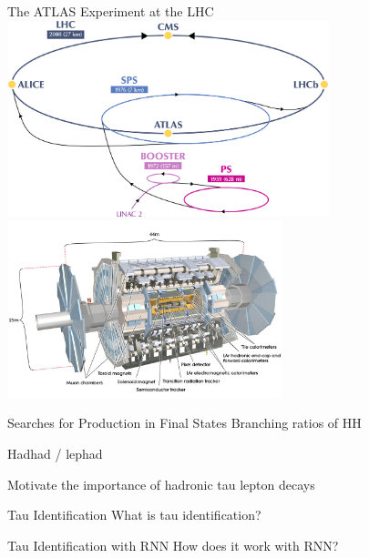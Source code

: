 \documentclass[11pt, xcolor={dvipsnames}, aspectratio=169]{beamer}
\begin{document}
\begin{frame}{The ATLAS Experiment at the LHC}
  \includegraphics[width=0.7\textwidth]{lhc/cern_complex_trim_otherexp_removed}%
  \includegraphics[width=0.6\textwidth]{atlas/atlas_overview}
\end{frame}


\begin{frame}{Searches for \HH Production in \bbtautau Final States}
  Branching ratios of HH

  Hadhad / lephad

  Motivate the importance of hadronic tau lepton decays
\end{frame}


\begin{frame}{Tau Identification}
  What is tau identification?
\end{frame}


\begin{frame}{Tau Identification with RNN}
  How does it work with RNN?
\end{frame}

\end{document}

